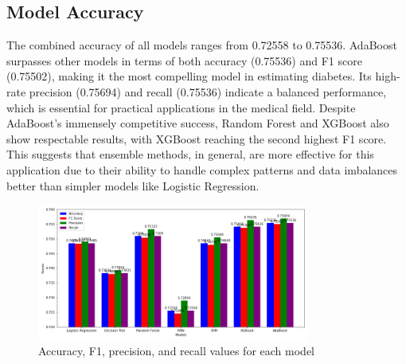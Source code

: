 \documentclass[12pt]{article}
\begin{document}
\subsection{Model Accuracy}
The combined accuracy of all models ranges from 0.72558 to 0.75536. AdaBoost surpasses other models in terms of both accuracy (0.75536) and F1 score (0.75502), making it the most compelling model in estimating diabetes. Its high-rate precision (0.75694) and recall (0.75536) indicate a balanced performance, which is essential for practical applications in the medical field. Despite AdaBoost's immensely competitive success, Random Forest and XGBoost also show respectable results, with XGBoost reaching the second highest F1 score. This suggests that ensemble methods, in general, are more effective for this application due to their ability to handle complex patterns and data imbalances better than simpler models like Logistic Regression.
\begin{figure}[H]
  \centering
  \includegraphics[width=0.8\textwidth]{combined.png}
  \caption{Accuracy, F1, precision, and recall values for each model}
  \label{fig:15}
\end{figure}
\end{document}
